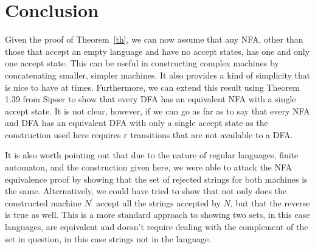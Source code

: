 \documentclass[10pt]{article}
\theoremstyle{definition}
\begin{document}
\section{ Conclusion }

Given the proof of Theorem~\ref{th}, we can now assume that any NFA, other than those that accept an empty language and have no accept states, has one and only one accept state. This can be useful in constructing complex machines by concatenating smaller, simpler machines. It also provides a kind of simplicity that is nice to have at times. Furthermore, we can extend this result using Theorem 1.39 from Sipser to show that every DFA has an equivalent NFA with a single accept state\cite{Sipser}. It is not clear, however, if we can go as far as to say that every NFA and DFA has an equivalent DFA with only a single accept state as the construction used here requires $\varepsilon$ transitions that are not available to a DFA\@.

It is also worth pointing out that due to the nature of regular languages, finite automaton, and the construction given here, we were able to attack the NFA equivalence proof by showing that the set of rejected strings for both machines is the same. Alternatively, we could have tried to show that not only does the constructed machine $N^\prime$ accept all the strings accepted by $N$, but that the reverse is true as well. This is a more standard approach to showing two sets, in this case languages, are equivalent and doesn't require dealing with the complement of the set in question, in this case strings not in the language.




\end{document}
